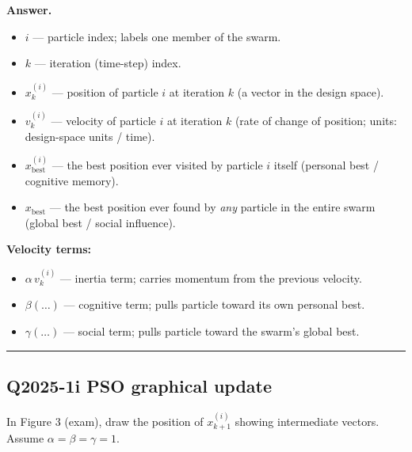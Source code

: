 \documentclass[11pt,a4paper]{article}
\newcommand{\Q}[2]{\subsection*{Q#1 \quad #2}}
\newenvironment{answer}{\medskip\textbf{Answer.}\par}{\bigskip\hrule\bigskip}
\begin{document}
\begin{answer}
\begin{itemize}[leftmargin=*]
  \item $i$ — particle index; labels one member of the swarm.
  \item $k$ — iteration (time-step) index.
  \item $x^{(i)}_k$ — position of particle $i$ at iteration $k$
        (a vector in the design space).
  \item $v^{(i)}_k$ — velocity of particle $i$ at iteration $k$
        (rate of change of position; units: design-space units / time).
  \item $x^{(i)}_\text{best}$ — the best position ever visited by
        particle $i$ itself (personal best / cognitive memory).
  \item $x_\text{best}$ — the best position ever found by \emph{any}
        particle in the entire swarm (global best / social influence).
\end{itemize}

\textbf{Velocity terms:}
\begin{itemize}[leftmargin=*]
  \item $\alpha\,v^{(i)}_k$ — inertia term; carries momentum from
        the previous velocity.
  \item $\beta(\ldots)$ — cognitive term; pulls particle toward its
        own personal best.
  \item $\gamma(\ldots)$ — social term; pulls particle toward the
        swarm's global best.
\end{itemize}
\end{answer}


\Q{2025-1i}{[3 marks] PSO graphical update}
In Figure 3 (exam), draw the position of $x^{(i)}_{k+1}$ showing
intermediate vectors.  Assume $\alpha = \beta = \gamma = 1$.
\end{document}
